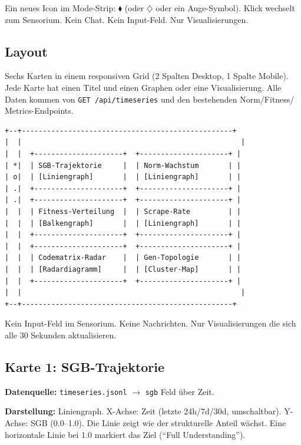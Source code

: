\documentclass[11pt,a4paper]{article}
\begin{document}
Ein neues Icon im Mode-Strip: $\blacklozenge$ (oder $\diamondsuit$ 
oder ein Auge-Symbol). Klick wechselt zum Sensorium. Kein Chat. 
Kein Input-Feld. Nur Visualisierungen.

\subsection{Layout}

Sechs Karten in einem responsiven Grid (2 Spalten Desktop, 
1 Spalte Mobile). Jede Karte hat einen Titel und einen 
Graphen oder eine Visualisierung. Alle Daten kommen von 
\texttt{GET /api/timeseries} und den bestehenden Norm/Fitness/
Metrics-Endpoints.

\begin{lstlisting}[style=bash]
+--+--------------------------------------------------+
|  |                                                    |
|  |  +---------------------+  +---------------------+ |
| *|  | SGB-Trajektorie     |  | Norm-Wachstum       | |
| o|  | [Liniengraph]       |  | [Liniengraph]       | |
| .|  +---------------------+  +---------------------+ |
| .|  +---------------------+  +---------------------+ |
|  |  | Fitness-Verteilung  |  | Scrape-Rate         | |
|  |  | [Balkengraph]       |  | [Liniengraph]       | |
|  |  +---------------------+  +---------------------+ |
|  |  +---------------------+  +---------------------+ |
|  |  | Codematrix-Radar    |  | Gen-Topologie       | |
|  |  | [Radardiagramm]     |  | [Cluster-Map]       | |
|  |  +---------------------+  +---------------------+ |
|  |                                                    |
+--+--------------------------------------------------+
\end{lstlisting}

Kein Input-Feld im Sensorium. Keine Nachrichten. Nur 
Visualisierungen die sich alle 30 Sekunden aktualisieren.

\subsection{Karte 1: SGB-Trajektorie}

\textbf{Datenquelle:} \texttt{timeseries.jsonl} $\to$ 
\texttt{sgb} Feld \"uber Zeit.

\textbf{Darstellung:} Liniengraph. X-Achse: Zeit (letzte 
24h/7d/30d, umschaltbar). Y-Achse: SGB (0.0--1.0). 
Die Linie zeigt wie der strukturelle Anteil w\"achst. 
Eine horizontale Linie bei 1.0 markiert das Ziel 
(``Full Understanding'').
\end{document}
